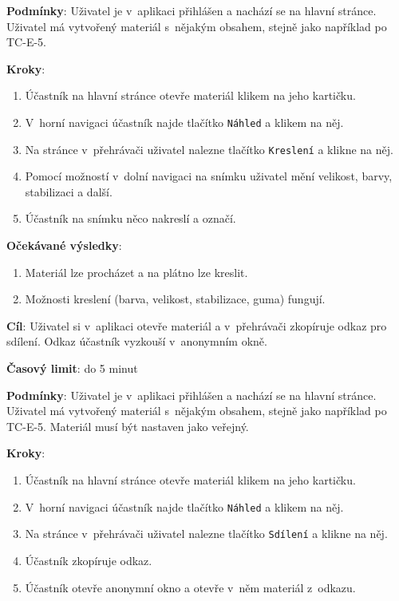 \textbf{Podmínky}:  Uživatel je v~aplikaci přihlášen a nachází se na hlavní stránce.  Uživatel má vytvořený materiál s~nějakým obsahem, stejně jako například po TC-E-5.

\textbf{Kroky}:

\begin{enumerate}[leftmargin=1.4cm]
    \item Účastník na hlavní stránce otevře materiál klikem na jeho kartičku.
    \item V~horní navigaci účastník najde tlačítko \verb|Náhled| a klikem na něj.
    \item Na stránce v~přehrávači uživatel nalezne tlačítko \verb|Kreslení| a klikne na něj.
    \item Pomocí možností v~dolní navigaci na snímku uživatel mění velikost, barvy, stabilizaci a další.
    \item Účastník na snímku něco nakreslí a označí.
\end{enumerate}

\textbf{Očekávané výsledky}:

\begin{enumerate}[leftmargin=1.4cm]
    \item Materiál lze procházet a na plátno lze kreslit.
    \item Možnosti kreslení (barva, velikost, stabilizace, guma) fungují.
\end{enumerate}






\vspace{1em}

\textbf{Cíl}: Uživatel si v~aplikaci otevře materiál a v~přehrávači zkopíruje odkaz pro sdílení. Odkaz účastník vyzkouší v~anonymním okně.

\textbf{Časový limit}: do 5 minut

\textbf{Podmínky}:  Uživatel je v~aplikaci přihlášen a nachází se na hlavní stránce.  Uživatel má vytvořený materiál s~nějakým obsahem, stejně jako například po TC-E-5. Materiál musí být nastaven jako veřejný.

\textbf{Kroky}:

\begin{enumerate}[leftmargin=1.4cm]
    \item Účastník na hlavní stránce otevře materiál klikem na jeho kartičku.
    \item V~horní navigaci účastník najde tlačítko \verb|Náhled| a klikem na něj.
    \item Na stránce v~přehrávači uživatel nalezne tlačítko \verb|Sdílení| a klikne na něj.
    \item Účastník zkopíruje odkaz.
    \item Účastník otevře anonymní okno a otevře v~něm materiál z~odkazu.
\end{enumerate}

